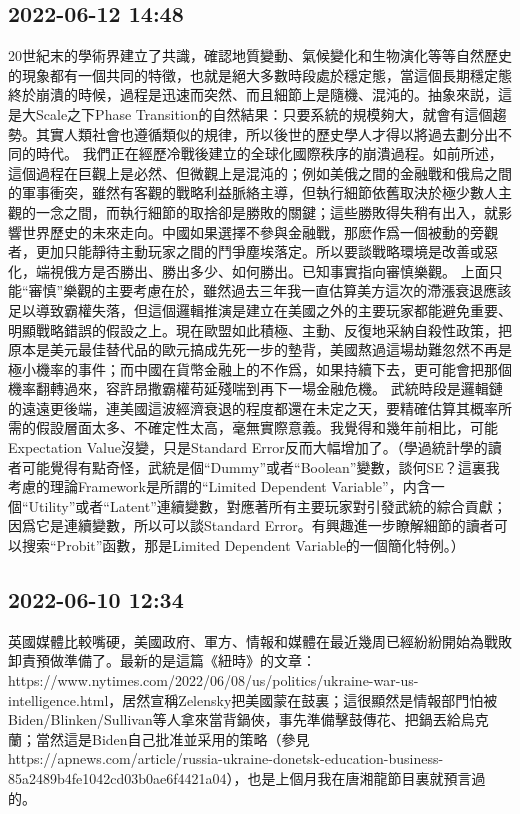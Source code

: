 \documentclass[twocolumn]{ctexart}
\begin{document}
\subsection*{2022-06-12 14:48}

20世紀末的學術界建立了共識，確認地質變動、氣候變化和生物演化等等自然歷史的現象都有一個共同的特徵，也就是絕大多數時段處於穩定態，當這個長期穩定態終於崩潰的時候，過程是迅速而突然、而且細節上是隨機、混沌的。抽象來説，這是大Scale之下Phase Transition的自然結果：只要系統的規模夠大，就會有這個趨勢。其實人類社會也遵循類似的規律，所以後世的歷史學人才得以將過去劃分出不同的時代。
我們正在經歷冷戰後建立的全球化國際秩序的崩潰過程。如前所述，這個過程在巨觀上是必然、但微觀上是混沌的；例如美俄之間的金融戰和俄烏之間的軍事衝突，雖然有客觀的戰略利益脈絡主導，但執行細節依舊取決於極少數人主觀的一念之間，而執行細節的取捨卻是勝敗的關鍵；這些勝敗得失稍有出入，就影響世界歷史的未來走向。中國如果選擇不參與金融戰，那麽作爲一個被動的旁觀者，更加只能靜待主動玩家之間的鬥爭塵埃落定。所以要談戰略環境是改善或惡化，端視俄方是否勝出、勝出多少、如何勝出。已知事實指向審慎樂觀。
上面只能“審慎”樂觀的主要考慮在於，雖然過去三年我一直估算美方這次的滯漲衰退應該足以導致霸權失落，但這個邏輯推演是建立在美國之外的主要玩家都能避免重要、明顯戰略錯誤的假設之上。現在歐盟如此積極、主動、反復地采納自殺性政策，把原本是美元最佳替代品的歐元搞成先死一步的墊背，美國熬過這場劫難忽然不再是極小機率的事件；而中國在貨幣金融上的不作爲，如果持續下去，更可能會把那個機率翻轉過來，容許昂撒霸權苟延殘喘到再下一場金融危機。
武統時段是邏輯鏈的遠遠更後端，連美國這波經濟衰退的程度都還在未定之天，要精確估算其概率所需的假設層面太多、不確定性太高，毫無實際意義。我覺得和幾年前相比，可能Expectation Value沒變，只是Standard Error反而大幅增加了。（學過統計學的讀者可能覺得有點奇怪，武統是個“Dummy”或者“Boolean”變數，談何SE？這裏我考慮的理論Framework是所謂的“Limited Dependent Variable”，内含一個“Utility”或者“Latent”連續變數，對應著所有主要玩家對引發武統的綜合貢獻；因爲它是連續變數，所以可以談Standard Error。有興趣進一步瞭解細節的讀者可以搜索“Probit”函數，那是Limited Dependent Variable的一個簡化特例。）
\subsection*{2022-06-10 12:34}

英國媒體比較嘴硬，美國政府、軍方、情報和媒體在最近幾周已經紛紛開始為戰敗卸責預做準備了。最新的是這篇《紐時》的文章：https://www.nytimes.com/2022/06/08/us/politics/ukraine-war-us-intelligence.html，居然宣稱Zelensky把美國蒙在鼓裏；這很顯然是情報部門怕被Biden/Blinken/Sullivan等人拿來當背鍋俠，事先準備擊鼓傳花、把鍋丟給烏克蘭；當然這是Biden自己批准並采用的策略（參見https://apnews.com/article/russia-ukraine-donetsk-education-business-85a2489b4fe1042cd03b0ae6f4421a04），也是上個月我在唐湘龍節目裏就預言過的。
\end{document}
